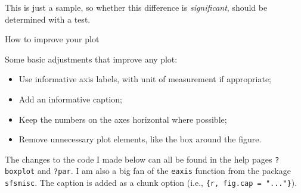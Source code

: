 \documentclass[
]{book}
\providecommand{\tightlist}{%
  \setlength{\itemsep}{0pt}\setlength{\parskip}{0pt}}
\begin{document}
This is just a sample, so whether this difference is \emph{significant}, should be determined with a test.

How to improve your plot

Some basic adjustments that improve any plot:

\begin{itemize}
\tightlist
\item
  Use informative axis labels, with unit of measurement if appropriate;
\item
  Add an informative caption;
\item
  Keep the numbers on the axes horizontal where possible;
\item
  Remove unnecessary plot elements, like the box around the figure.
\end{itemize}

The changes to the code I made below can all be found in the help pages \texttt{?boxplot} and \texttt{?par}. I am also a big fan of the \texttt{eaxis} function from the package \texttt{sfsmisc}. The caption is added as a chunk option (i.e., \texttt{\textasciigrave{}\textasciigrave{}\textasciigrave{}\{r,\ fig.cap\ =\ "..."\}}).
\end{document}
